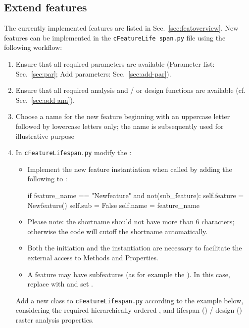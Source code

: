 \subsection{Extend features} \label{sec:add-feat}
The currently implemented features are listed in Sec.~\ref{sec:featoverview}. New features can be implemented in the \texttt{cFeatureLife span.py} file using the following workflow:
\begin{enumerate}
	\item Ensure that all required parameters are available (Parameter list: Sec.~\ref{sec:par}; Add parameters: Sec.~\ref{sec:add-par}).
	\item Ensure that all required analysis and / or design functions are available (cf. Sec.~\ref{sec:add-ana}).
	\item Choose a name for the new feature beginning with an uppercase letter followed by lowercase letters only; the name  is subsequently used for illustrative purpose
	\item In \texttt{cFeatureLifespan.py} modify the :\\
	\begin{itemize}
		\item Implement the new feature instantiation when called by adding the following to :
		\begin{python}
   if feature_name == "Newfeature" and not(sub_feature):
      self.feature = Newfeature()
      self.sub = False
      self.name = feature_name
		\end{python}
		\item Please note: the shortname should not have more than 6 characters; otherwise the code will cutoff the shortname automatically.\\
		\item Both the initiation  and the instantiation  are necessary to facilitate the external access to Methods and Properties.
		\item A feature may have subfeatures (as for example the ). In this case, replace  with  and set .
	\end{itemize}
	Add a new class to \texttt{cFeatureLifespan.py} according to the example below, considering the required hierarchically ordered ,  and lifespan () / design () raster analysis properties.

\end{enumerate}
